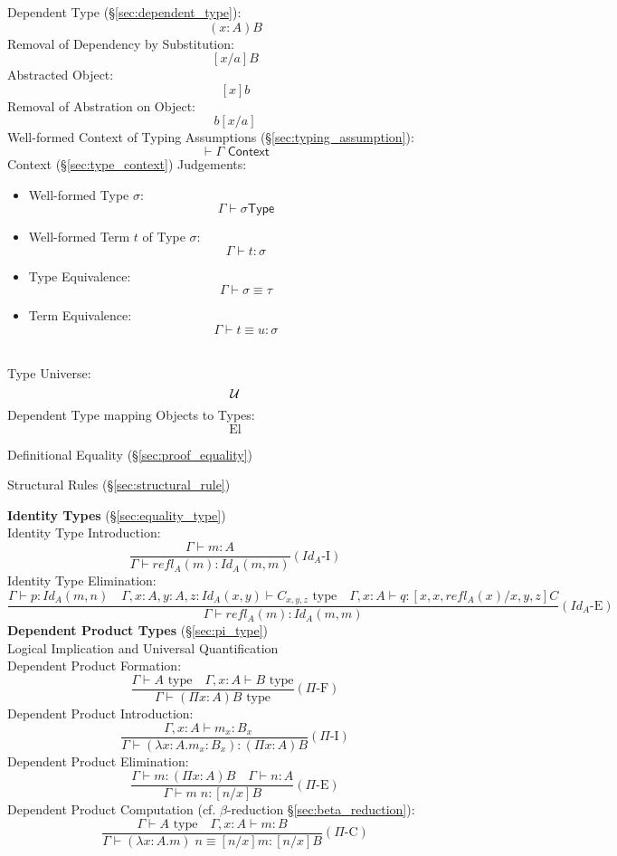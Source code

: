 Dependent Type (\S\ref{sec:dependent_type}):
\[
  (x:A)B
\]
Removal of Dependency by Substitution:
\[
  [x/a]B
\]
Abstracted Object:
\[
  [x]b
\]
Removal of Abstration on Object:
\[
  b[x/a]
\]
Well-formed Context of Typing Assumptions
(\S\ref{sec:typing_assumption}):
\[
  \vdash \Gamma \textsf{ Context}
\]
Context (\S\ref{sec:type_context}) Judgements:
\begin {itemize}
\item Well-formed Type $\sigma$:
  \[
    \Gamma \vdash \sigma \mathsf{ Type}
  \]
\item Well-formed Term $t$ of Type $\sigma$:
  \[
    \Gamma \vdash t : \sigma
  \]
\item Type Equivalence:
  \[
    \Gamma \vdash \sigma \equiv \tau
  \]
\item Term Equivalence:
  \[
    \Gamma \vdash t \equiv u : \sigma
  \]
\end {itemize}
\hfill\\
Type Universe:
\[
  \mathcal{U}
\]
Dependent Type mapping Objects to Types:
\[
  \textrm{El}
\]

Definitional Equality (\S\ref{sec:proof_equality})

Structural Rules (\S\ref{sec:structural_rule})



\textbf{Identity Types} (\S\ref{sec:equality_type})
\\
Identity Type Introduction:
\[
  \frac{
    \Gamma \vdash m : A
  }{
    \Gamma \vdash refl_A(m) : Id_A(m,m)
  } (Id_A\text{-I})
\]
Identity Type Elimination:
\[
  \frac{
    \Gamma \vdash p : Id_A (m,n) \quad
    \Gamma, x:A, y:A, z : Id_A(x,y) \vdash C_{x,y,z} \text{ type}\quad
    \Gamma, x : A \vdash q : [x, x, refl_A(x)/x,y,z]C
  }{
    \Gamma \vdash refl_A(m) : Id_A(m,m)
  } (Id_A\text{-E})
\]
\textbf{Dependent Product Types} (\S\ref{sec:pi_type})
\\
Logical Implication and Universal Quantification
\\
Dependent Product Formation:
\[
  \frac{
    \Gamma \vdash A \text{ type} \quad
    \Gamma, x:A \vdash B \text{ type}
  }{
    \Gamma \vdash (\Pi x:A) B \text{ type}
  } (\Pi\text{-F})
\]
Dependent Product Introduction:
\[
  \frac{
    \Gamma, x : A \vdash m_x : B_x \quad
  }{
    \Gamma \vdash (\lambda x:A.m_x : B_x) : (\Pi x:A) B
  } (\Pi\text{-I})
\]
Dependent Product Elimination:
\[
  \frac{
    \Gamma \vdash m : (\Pi x:A) B \quad
    \Gamma \vdash n : A
  }{
    \Gamma \vdash m\;n : [n/x]B
  } (\Pi\text{-E})
\]
Dependent Product Computation (cf. $\beta$-reduction
\S\ref{sec:beta_reduction}):
\[
  \frac{
    \Gamma \vdash A \text{ type} \quad
    \Gamma , x : A \vdash m : B
  }{
    \Gamma \vdash (\lambda x : A.m)\;n \equiv [n/x]m : [n/x]B
  } (\Pi\text{-C})
\]


